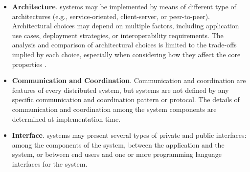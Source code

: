 \documentclass{sig-alternate}
\begin{document}
\begin{itemize}

\item \textbf{Architecture}. \pilot systems may be implemented by means of
  different type of architectures (e.g., service-oriented, client-server, or
  peer-to-peer). Architectural choices may depend on multiple factors, including
  application use cases, deployment strategies, or interoperability
  requirements.  The analysis and comparison of architectural choices is limited
  to the trade-offs implied by each choice, especially when considering how they
  affect the core properties .


    

\item \textbf{Communication and Coordination}. Communication and coordination
  are features of every distributed system, but \pilot systems are not defined
  by any specific communication and coordination pattern or protocol. The
  details of communication and coordination among the \pilot system components
  are determined at implementation time.




\item \textbf{Interface}. \pilot systems may present several types of private
  and public interfaces: among the components of the \pilot system, between the
  application and the \pilot system, or between end users and one or more
  programming language interfaces for the \pilot system.


\end{itemize}
\end{document}
